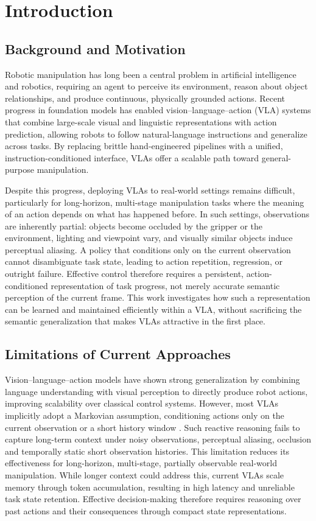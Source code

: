 \documentclass[12pt]{article}
\begin{document}
\section{Introduction}

\subsection{Background and Motivation}
Robotic manipulation has long been a central problem in artificial intelligence and robotics, requiring an agent to perceive its environment, reason about object relationships, and produce continuous, physically grounded actions. Recent progress in foundation models has enabled vision--language--action (VLA) systems that combine large-scale visual and linguistic representations with action prediction, allowing robots to follow natural-language instructions and generalize across tasks. By replacing brittle hand-engineered pipelines with a unified, instruction-conditioned interface, VLAs offer a scalable path toward general-purpose manipulation.

Despite this progress, deploying VLAs to real-world settings remains difficult, particularly for long-horizon, multi-stage manipulation tasks where the meaning of an action depends on what has happened before. In such settings, observations are inherently partial: objects become occluded by the gripper or the environment, lighting and viewpoint vary, and visually similar objects induce perceptual aliasing. A policy that conditions only on the current observation cannot disambiguate task state, leading to action repetition, regression, or outright failure. Effective control therefore requires a persistent, action-conditioned representation of task progress, not merely accurate semantic perception of the current frame. This work investigates how such a representation can be learned and maintained efficiently within a VLA, without sacrificing the semantic generalization that makes VLAs attractive in the first place.

\subsection{Limitations of Current Approaches}
Vision--language--action models \cite{kim2024openvla,ye2025vla,zitkovich2023rt} have shown strong generalization by combining language understanding with visual perception to directly produce robot actions, improving scalability over classical control systems. However, most VLAs implicitly adopt a Markovian assumption, conditioning actions only on the current observation or a short history window \cite{jang2025contextvla,lin2025hif,wang2025lola}. Such reactive reasoning fails to capture long-term context under noisy observations, perceptual aliasing, occlusion and temporally static short observation histories. This limitation reduces its effectiveness for long-horizon, multi-stage, partially observable real-world manipulation. While longer context could address this, current VLAs scale memory through token accumulation, resulting in high latency and unreliable task state retention. Effective decision-making therefore requires reasoning over past actions and their consequences through compact state representations.
\end{document}
